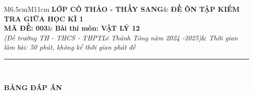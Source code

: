 \begin{tabular}{M{6.5cm}M{11cm}}
	\textbf{LỚP CÔ THẢO - THẦY SANG}& \textbf{ĐỀ ÔN TẬP KIỂM TRA GIỮA HỌC KÌ 1}\\
	\textbf{MÃ ĐỀ: 003}& \textbf{Bài thi môn: VẬT LÝ 12}\\
	\textit{(Đề trường TH - THCS - THPT\newline Lê Thánh Tông năm 2024 -2025)}& \textit{Thời gian làm bài: 50 phút, không kể thời gian phát đề}
	
	\noindent\rule{4cm}{0.8pt} \\
\end{tabular}
\setcounter{section}{0}
\begin{center}
	\textbf{\large BẢNG ĐÁP ÁN}
\end{center}
\section{}
\section{}
\section{}
